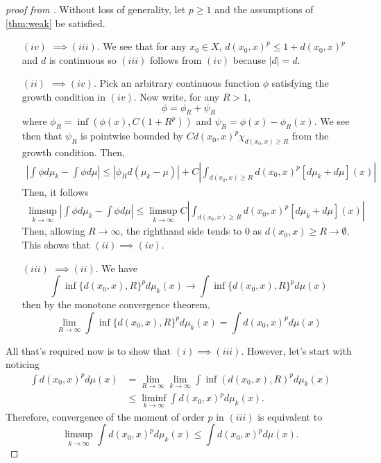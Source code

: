 \documentclass[12pt]{article}
\theoremstyle{plain}
\numberwithin{equation}{section}
\begin{document}
\begin{proof}[proof from \cite{villani}]
  Without loss of generality, let $p\ge 1$ and the assumptions of \autoref{thm:weak} be satisfied.
  \begin{enumerate}
    \item[$(iv)$] $\implies (iii)$. We see that for any $x_0\in X$, $d(x_0,x)^p \le 1+d(x_0,x)^p$ and $d$ is continuous so $(iii)$ follows from $(iv)$ because $|d| = d$.
    \item[$(ii)$] $\implies (iv)$. Pick an arbitrary continuous function $\phi$ satisfying the growth condition in $(iv)$. Now write, for any $R > 1$,
    \[\phi = \phi_R + \psi_R\]
    where $\phi_R = \inf(\phi(x), C(1+R^p))$ and $\psi_R = \phi(x) - \phi_R(x)$. We see then that $\psi_R$ is pointwise bounded by $C d(x_0,x)^p\chi_{d(x_0,x) \ge R}$ from the growth condition. Then, 
    \begin{align*}
      \left|\int \phi d\mu_k - \int \phi d\mu\right| \le \left|\phi_Rd(\mu_k - \mu)\right| + C\left|\int_{d(x_0,x) \ge R}d(x_0,x)^p[d\mu_k + d\mu](x)\right|
    \end{align*}
    Then, it follows 
    \begin{align*}
      \limsup_{k\to\infty}\left|\int \phi d\mu_k - \int \phi d\mu\right| \le \limsup_{k\to\infty}C\left|\int_{d(x_0,x) \ge R}d(x_0,x)^p[d\mu_k + d\mu](x)\right|
    \end{align*}
    Then, allowing $R\to\infty$, the righthand side tends to 0 as $d(x_0,x) \ge R \to \emptyset$. This shows that $(ii)\implies (iv)$.
    \item[$(iii)$] $\implies (ii)$. We have 
    \[\int\inf\{d(x_0,x),R\}^pd\mu_k(x)\to \int \inf\{d(x_0,x),R\}^pd\mu(x)\] 
    then by the monotone convergence theorem,
    \[\lim_{R\to\infty}\int\inf\{d(x_0,x),R\}^pd\mu_k(x)= \int d(x_0,x)^pd\mu(x)\] 
  \end{enumerate}
  All that's required now is to show that $(i)\implies(iii)$. However, let's start with noticing 
  \begin{align*}
    \int d(x_0,x)^pd\mu(x) &= \lim_{R\to\infty}\lim_{k\to\infty} \int\inf(d(x_0,x),R)^pd\mu_k(x) \\
    &\le \liminf_{k\to\infty}\int d(x_0,x)^pd\mu_k(x).
  \end{align*}
  Therefore, convergence of the moment of order $p$ in $(iii)$ is equivalent to 
  \begin{equation}
    \limsup_{k\to\infty}\int d(x_0,x)^pd\mu_k(x)\le \int d(x_0,x)^pd\mu(x).
  \end{equation}
\end{proof}
\end{document}
